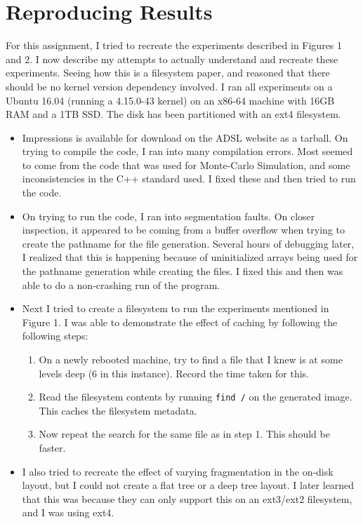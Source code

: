 \section{Reproducing Results}
For this assignment, I tried to recreate the experiments described in Figures 1 and 2. I now describe my attempts to actually understand and recreate these experiments. Seeing how this is a filesystem paper, and reasoned that there should be no kernel version dependency involved. I ran all experiments on a Ubuntu 16.04 (running a 4.15.0-43 kernel) on an x86-64 machine with 16GB RAM and a 1TB SSD. The disk has been partitioned with an ext4 filesystem.

\begin{itemize}
    \item Impressions is available for download on the ADSL website \cite{Impressions} as a tarball. On trying to compile the code, I ran into many compilation errors. Most seemed to come from the code that was used for Monte-Carlo Simulation, and some inconsistencies in the C++ standard used. I fixed these and then tried to run the code.
    \item On trying to run the code, I ran into segmentation faults. On closer inspection, it appeared to be coming from a buffer overflow when trying to create the pathname for the file generation. Several hours of debugging later, I realized that this is happening because of uninitialized arrays being used for the pathname generation while creating the files. I fixed this and then was able to do a non-crashing run of the program. 
    \item Next I tried to create a filesystem to run the experiments mentioned in Figure 1. I was able to demonstrate the effect of caching by following the following steps:
    \begin{enumerate}
        \item On a newly rebooted machine, try to find a file that I knew is at some levels deep (6 in this instance). Record the time taken for this.  
        \item Read the filesystem contents by running \texttt{find /} on the generated image. This caches the filesystem metadata.
        \item Now repeat the search for the same file as in step 1. This should be faster.
    \end{enumerate}
    \item I also tried to recreate the effect of varying fragmentation in the on-disk layout, but I could not create a flat tree or a deep tree layout. I later learned that this was because they can only support this on an ext3/ext2 filesystem, and I was using ext4.
\end{itemize}
